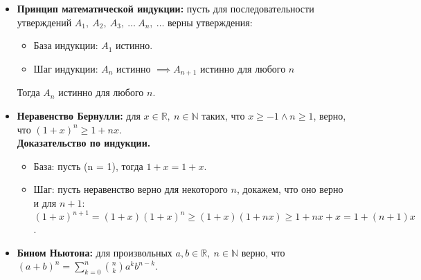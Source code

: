 \documentclass{article}
\begin{document}
\section{\centering}
\noindent{}
\begin{itemize}[leftmargin=*]
    \item \textbf{Принцип математической индукции:}
    пусть для последовательности утверждений \(A_1,\ A_2,\ A_3,\ \dots\ A_n,\ \dots\) верны утверждения:
    \begin{itemize}
        \item База индукции: \(A_1\) истинно.
        \item Шаг индукции: \(A_n\) истинно \(\implies A_{n + 1}\) истинно для любого \(n\)   
    \end{itemize}
    \noindent Тогда \(A_n\) истинно для любого \(n\).
    \item \textbf{Неравенство Бернулли:}
    для \(x \in \mathbb{R},\ n \in \mathbb{N}\) таких, что \(x \geq -1 \land n \geq 1\), верно, что \((1 + x)^n \geq 1 + nx\).\\
    \textbf{Доказательство по индукции.}
    \begin{itemize}
        \item База: пусть (n = 1), тогда \(1 + x = 1 + x\).
        \item Шаг: пусть неравенство верно для некоторого \(n\), докажем, что оно верно и для \(n + 1\): \[(1 + x)^{n + 1} = (1 + x)(1 + x)^n \geq (1 + x)(1 + nx) \geq 1 + nx + x = 1 + (n + 1)x\]. 
    \end{itemize}
    \item \textbf{Бином Ньютона:} для произвольных \(a, b \in \mathbb{R},\ n \in \mathbb{N}\) верно, что \(\displaystyle (a + b)^n = \sum\limits_{k = 0}^{n} \binom{n}{k} a^k b^{n - k}\).  
\end{itemize}

\end{document}
